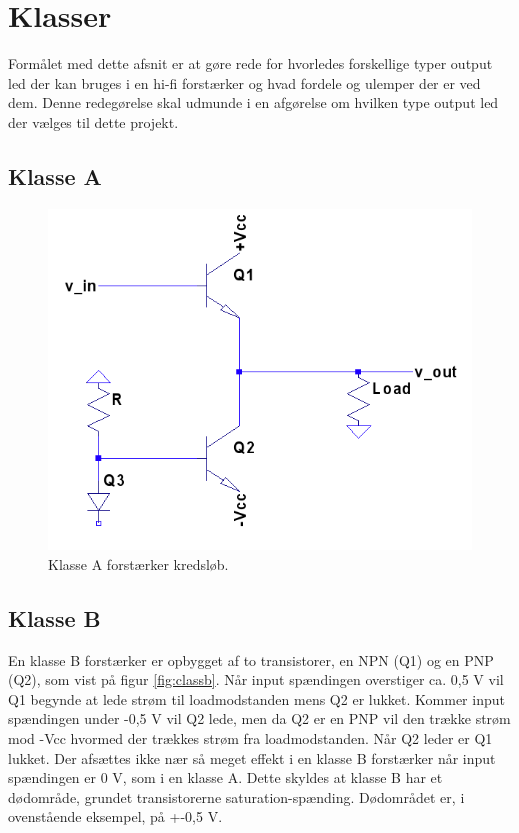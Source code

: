 \chapter{Klasser}
Formålet med dette afsnit er at gøre rede for hvorledes forskellige typer output led der kan bruges i en hi-fi forstærker og hvad fordele og ulemper der er ved dem. Denne redegørelse skal udmunde i en afgørelse om hvilken type output led der vælges til dette projekt.

\section{Klasse A}

\begin{figure}[h]
\centering
\includegraphics[scale=.6]{klasser/classa.png}
\caption{Klasse A forstærker kredsløb.}
\label{fig:classa}
\end{figure}


\section{Klasse B}
En klasse B forstærker er opbygget af to transistorer, en NPN (Q1) og en PNP (Q2), som vist på figur \ref{fig:classb}. Når input spændingen overstiger ca. 0,5 V vil Q1 begynde at lede strøm til loadmodstanden mens Q2 er lukket. Kommer input spændingen under -0,5 V vil Q2 lede, men da Q2 er en PNP vil den trække strøm mod -Vcc hvormed der trækkes strøm fra loadmodstanden. Når Q2 leder er Q1 lukket. 
Der afsættes ikke nær så meget effekt i en klasse B forstærker når input spændingen er 0 V, som i en klasse A. Dette skyldes at klasse B har et dødområde, grundet transistorerne saturation-spænding. Dødområdet er, i ovenstående eksempel, på +-0,5 V. 

